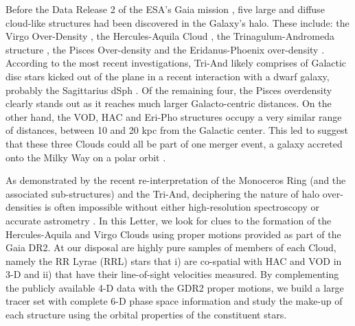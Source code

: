 \documentclass[a4paper,useAMS,usenatbib]{mnras}
\begin{document}
Before the Data Release 2 \citep[][]{Brown2018} of the ESA's Gaia
mission \citep[][]{Prusti2016}, five large and diffuse cloud-like
structures had been discovered in the Galaxy's halo. These include:
the Virgo Over-Density
\citep[VOD,][]{Vivas2001,Newberg2002,Duffau2006,Juric2008,Bonaca2012},
the Hercules-Aquila Cloud \citep[HAC,][]{Be07,Simion2014}, the
Trinagulum-Andromeda structure
\citep[Tri-And,][]{Rocha2004,Majewski2004,Deason2014}, the Pisces
Over-density \citep[][]{Sesar2007,Wa09,Nie2015} and the
Eridanus-Phoenix over-density \citep[Eri-Pho,][]{Li2016}. According to
the most recent investigations, Tri-And likely comprises of Galactic
disc stars kicked out of the plane in a recent interaction with a
dwarf galaxy, probably the Sagittarius dSph
\citep[e.g.][]{Pr15,Bergemann2018,Hayes2018}. Of the remaining four,
the Pisces overdensity clearly stands out as it reaches much larger
Galacto-centric distances. On the other hand, the VOD, HAC and Eri-Pho
structures occupy a very similar range of distances, between 10 and 20
kpc from the Galactic center. This led \citet{Li2016} to suggest that
these three Clouds could all be part of one merger event, a galaxy
accreted onto the Milky Way on a polar orbit \citep[see also][]{Juric2008}.

As demonstrated by the recent re-interpretation of the Monoceros Ring
(and the associated sub-structures) and the Tri-And, deciphering the
nature of halo over-densities is often impossible without either
high-resolution spectroscopy \citep[e.g.][]{Bergemann2018} or accurate
astrometry \citep[e.g.][]{deBoer2018,Deason2018}. In this Letter, we
look for clues to the formation of the Hercules-Aquila and Virgo
Clouds using proper motions provided as part of the Gaia DR2. At our
disposal are highly pure samples of members of each Cloud, namely the
RR Lyrae (RRL) stars that i) are co-spatial with HAC and VOD in 3-D and ii)
that have their line-of-sight velocities measured. By complementing
the publicly available 4-D data with the GDR2 proper motions, we build
a large tracer set with complete 6-D phase space information and study
the make-up of each structure using the orbital properties of the
constituent stars.
%
\end{document}

